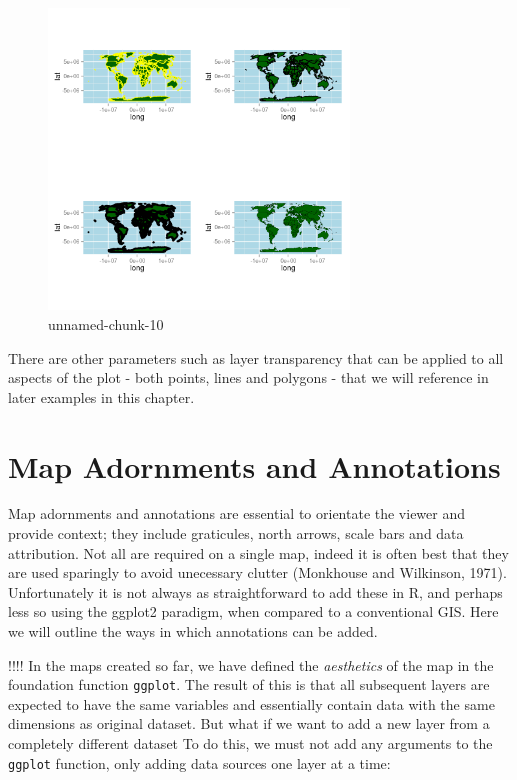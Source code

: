 \documentclass[]{article}
\let\Oldincludegraphics\includegraphics
\renewcommand{\includegraphics}[1]{\Oldincludegraphics[width=8cm]{#1}}
\begin{document}
\begin{figure}[htbp]
\centering
\includegraphics{figure/unnamed-chunk-10.png}
\caption{unnamed-chunk-10}
\end{figure}

There are other parameters such as layer transparency that can be
applied to all aspects of the plot - both points, lines and polygons -
that we will reference in later examples in this chapter.

\section{Map Adornments and Annotations}

Map adornments and annotations are essential to orientate the viewer and
provide context; they include graticules, north arrows, scale bars and
data attribution. Not all are required on a single map, indeed it is
often best that they are used sparingly to avoid unecessary clutter
(Monkhouse and Wilkinson, 1971). Unfortunately it is not always as
straightforward to add these in R, and perhaps less so using the ggplot2
paradigm, when compared to a conventional GIS. Here we will outline the
ways in which annotations can be added.

!!!! In the maps created so far, we have defined the \emph{aesthetics}
of the map in the foundation function \texttt{ggplot}. The result of
this is that all subsequent layers are expected to have the same
variables and essentially contain data with the same dimensions as
original dataset. But what if we want to add a new layer from a
completely different dataset To do this, we must not add any arguments
to the \texttt{ggplot} function, only adding data sources one layer at a
time:
\end{document}
